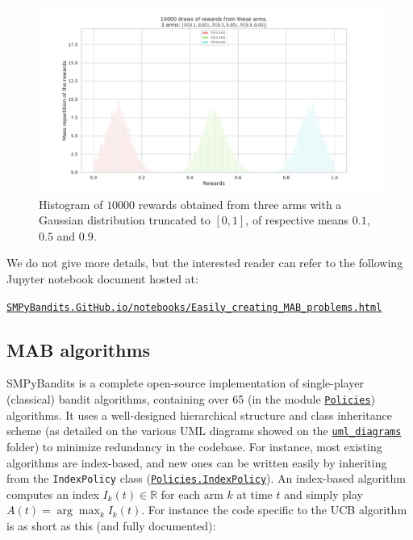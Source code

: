 \begin{figure}[h!]  %
	\centering
	\includegraphics[width=0.95\linewidth]{exampleOfRewards.pdf}
	\caption{Histogram of $10000$ \iid{} rewards obtained from three arms with a Gaussian distribution truncated to $[0,1]$, of respective means $0.1$, $0.5$ and $0.9$.}
	\label{fig:3:exampleOfRewards}
\end{figure}


We do not give more details, but the interested reader can refer to the following Jupyter notebook \cite{jupyter} document hosted at:\\
\begin{small}
    \href{https://smpybandits.github.io/notebooks/Easily_creating_MAB_problems.html}{\texttt{SMPyBandits.GitHub.io/notebooks/Easily\_creating\_MAB\_problems.html}}
\end{small}

\subsection{MAB algorithms}

SMPyBandits is a complete open-source implementation of single-player (classical) bandit algorithms,
containing over 65 (in the module \texttt{\href{https://SMPyBandits.GitHub.io/docs/Policies.html}{Policies}}) algorithms.
It uses a well-designed hierarchical structure and class inheritance scheme (as detailed on the various UML diagrams showed on the \texttt{\href{https://SMPyBandits.GitHub.io/uml_diagrams/README.html}{uml\_diagrams}} folder) to minimize redundancy in the codebase.
For instance, most existing algorithms are index-based, and new ones can be written easily by inheriting from the \texttt{IndexPolicy} class (\texttt{\href{https://SMPyBandits.GitHub.io/docs/Policies.IndexPolicy.html}{Policies.IndexPolicy}}).
An index-based algorithm computes an index $I_k(t)\in\mathbb{R}$ for each arm $k$ at time $t$ and simply play $A(t) = \arg\max_k I_k(t)$.
For instance the code specific to the UCB algorithm \cite{LaiRobbins85,Auer02} is as short as this (and fully documented):

